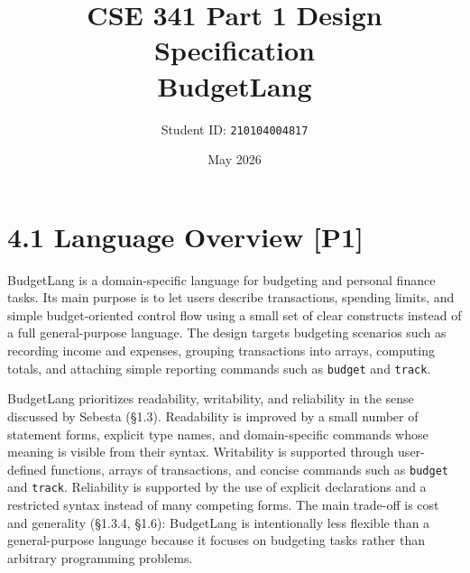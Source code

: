 \documentclass[11pt]{article}
\title{CSE 341 Part 1 Design Specification\\BudgetLang}
\author{Student ID: \texttt{210104004817}}
\date{May 2026}
\begin{document}
\maketitle

\section*{4.1 Language Overview [P1]}
BudgetLang is a domain-specific language for budgeting and personal finance tasks. Its main purpose is to let users describe transactions, spending limits, and simple budget-oriented control flow using a small set of clear constructs instead of a full general-purpose language. The design targets budgeting scenarios such as recording income and expenses, grouping transactions into arrays, computing totals, and attaching simple reporting commands such as \texttt{budget} and \texttt{track}.

BudgetLang prioritizes readability, writability, and reliability in the sense discussed by Sebesta (\S1.3). Readability is improved by a small number of statement forms, explicit type names, and domain-specific commands whose meaning is visible from their syntax. Writability is supported through user-defined functions, arrays of transactions, and concise commands such as \texttt{budget} and \texttt{track}. Reliability is supported by the use of explicit declarations and a restricted syntax instead of many competing forms. The main trade-off is cost and generality (\S1.3.4, \S1.6): BudgetLang is intentionally less flexible than a general-purpose language because it focuses on budgeting tasks rather than arbitrary programming problems.
\end{document}

